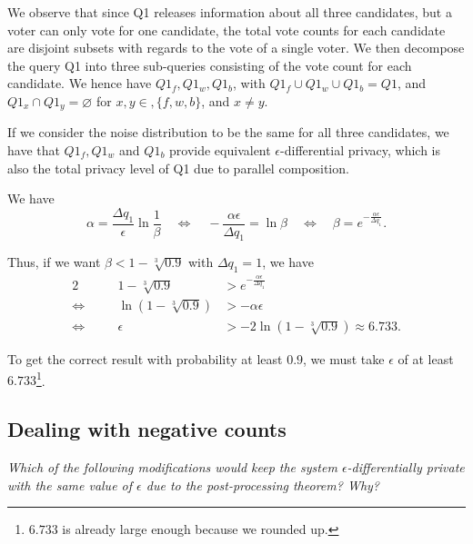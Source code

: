 \documentclass[parskip=half]{scrartcl}
\begin{document}
\begin{enumerate}
    We observe that since Q1 releases information about all three candidates,
    but a voter can only vote for one candidate, the total vote counts for each
    candidate are disjoint subsets with regards to the vote of a single voter.
    We then decompose the query Q1 into three sub-queries consisting of the
    vote count for each candidate. We hence have $Q1_f, Q1_w, Q1_b$, with
    $Q1_f \cup Q1_w \cup Q1_b = Q1$, and $Q1_x \cap Q1_y = \varnothing$ for
    $x, y\in, \{f, w, b\}$, and $x\neq y$.

    If we consider the noise distribution to be the same for all three
    candidates, we have that $Q1_f, Q1_w$ and $Q1_b$ provide equivalent
    $\epsilon$-differential privacy, which is also the total privacy level of
    Q1 due to parallel composition.

    We have
    $$
        \alpha = \frac{\Delta q_1}{\epsilon}\ln{\frac{1}{\beta}}
        \quad\Leftrightarrow\quad
        -\frac{\alpha\epsilon}{\Delta q_1} = \ln{\beta}
        \quad\Leftrightarrow\quad
        \beta = e^{-\frac{\alpha\epsilon}{\Delta q_1}}.
    $$
    
    Thus, if we want $\beta < 1 - \sqrt[3]{0.9}$ with $\Delta q_1 = 1$, we have
    \begin{alignat*}{2}
        \quad &&
            1 - \sqrt[3]{0.9} &> e^{-\frac{\alpha\epsilon}{\Delta q_1}}\\
        \Leftrightarrow\quad &&
            \ln{\left(1 - \sqrt[3]{0.9}\right)} &> -\alpha\epsilon\\
        \Leftrightarrow\quad &&
            \epsilon &> -2 \ln{\left(1 - \sqrt[3]{0.9}\right)} \approx 6.733.
    \end{alignat*}

    To get the correct result with probability at least $0.9$, we must take
    $\epsilon$ of at least $6.733$\footnote{$6.733$ is already large enough
    because we rounded up.}.
\end{enumerate}

\subsection{Dealing with negative counts}

\textit{Which of the following modifications would keep the system
$\epsilon$-differentially private with the same value of $\epsilon$ due to the
post-processing theorem? Why?}
\end{document}
